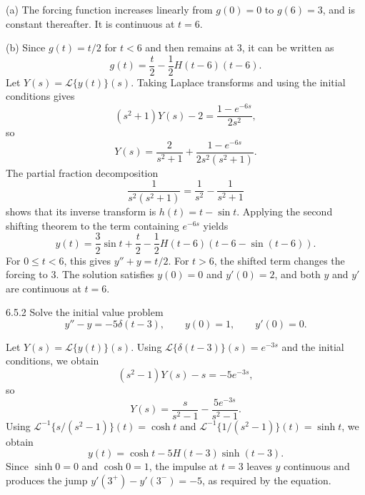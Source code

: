 \documentclass[11pt,oneside]{article}
\begin{document}
\begin{solution}
\noindent\textup{(a)} The forcing function increases linearly from $g(0)=0$ to $g(6)=3$, and is constant thereafter. It is continuous at $t=6$.
\begin{center}
\end{center}

\noindent\textup{(b)} Since $g(t)=t/2$ for $t<6$ and then remains at $3$, it can be written as
\[
    g(t)=\frac{t}{2}-\frac{1}{2}H(t-6)(t-6).
\]
Let $Y(s)=\mathcal{L}\{y(t)\}(s)$. Taking Laplace transforms and using the initial conditions gives
\[
    (s^2+1)Y(s)-2
     =\frac{1-e^{-6s}}{2s^2},
\]
so
\[
    Y(s)=\frac{2}{s^2+1}
    +\frac{1-e^{-6s}}{2s^2(s^2+1)}.
\]
The partial fraction decomposition
\[
    \frac{1}{s^2(s^2+1)}=\frac{1}{s^2}-\frac{1}{s^2+1}
\]
shows that its inverse transform is $h(t)=t-\sin t$. Applying the second shifting theorem to the term containing $e^{-6s}$ yields
\[
    \boxed{
    y(t)=\frac32\sin t+\frac{t}{2}
    -\frac{1}{2}H(t-6)(t-6-\sin(t-6))
    }.
\]
For $0\leq t<6$, this gives $y''+y=t/2$. For $t>6$, the shifted term changes the forcing to $3$. The solution satisfies $y(0)=0$ and $y'(0)=2$, and both $y$ and $y'$ are continuous at $t=6$.
\end{solution}

\begin{problem}{6.5.2}
Solve the initial value problem
\[
    y''-y=-5\delta(t-3), \qquad
    y(0)=1, \qquad y'(0)=0.
\]
\end{problem}

\begin{solution}
Let $Y(s)=\mathcal{L}\{y(t)\}(s)$. Using $\mathcal{L}\{\delta(t-3)\}(s)=e^{-3s}$ and the initial conditions, we obtain
\[
    (s^2-1)Y(s)-s=-5e^{-3s},
\]
so
\[
    Y(s)=\frac{s}{s^2-1}-\frac{5e^{-3s}}{s^2-1}.
\]
Using $\mathcal{L}^{-1}\{s/(s^2-1)\}(t)=\cosh t$ and $\mathcal{L}^{-1}\{1/(s^2-1)\}(t)=\sinh t$, we obtain
\[
    \boxed{y(t)=\cosh t-5H(t-3)\sinh(t-3)}.
\]
Since $\sinh 0=0$ and $\cosh 0=1$, the impulse at $t=3$ leaves $y$ continuous and produces the jump $y'(3^+)-y'(3^-)=-5$, as required by the equation.
\end{solution}
\end{document}
